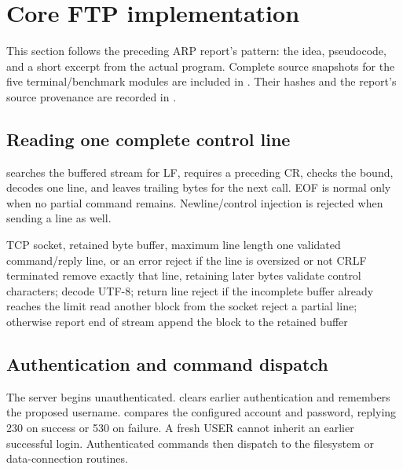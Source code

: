 \begingroup
{}
\section{Core FTP implementation}\label{sec:ftp-core}
This section follows the preceding ARP report's pattern: the idea, pseudocode, and a short excerpt from the actual program. Complete source snapshots for the five terminal/benchmark modules are included in . Their hashes and the report's source provenance are recorded in .

\subsection{Reading one complete control line}
 searches the buffered stream for LF, requires a preceding CR, checks the bound, decodes one line, and leaves trailing bytes for the next call. EOF is normal only when no partial command remains. Newline/control injection is rejected when sending a line as well.

\begin{algorithm}[H]\small
\caption{Read one FTP control line}
\begin{algorithmic}[1]
\Require TCP socket, retained byte buffer, maximum line length
\Ensure one validated command/reply line, or an error
  \State reject if the line is oversized or not CRLF terminated
  \State remove exactly that line, retaining later bytes
  \State validate control characters; decode UTF-8; return line
 \EndIf
 \State reject if the incomplete buffer already reaches the limit
 \State read another block from the socket
  \State reject a partial line; otherwise report end of stream
 \EndIf
 \State append the block to the retained buffer
\EndWhile
\end{algorithmic}
\end{algorithm}



\subsection{Authentication and command dispatch}
The server begins unauthenticated.  clears earlier authentication and remembers the proposed username.  compares the configured account and password, replying 230 on success or 530 on failure. A fresh USER cannot inherit an earlier successful login. Authenticated commands then dispatch to the filesystem or data-connection routines.

